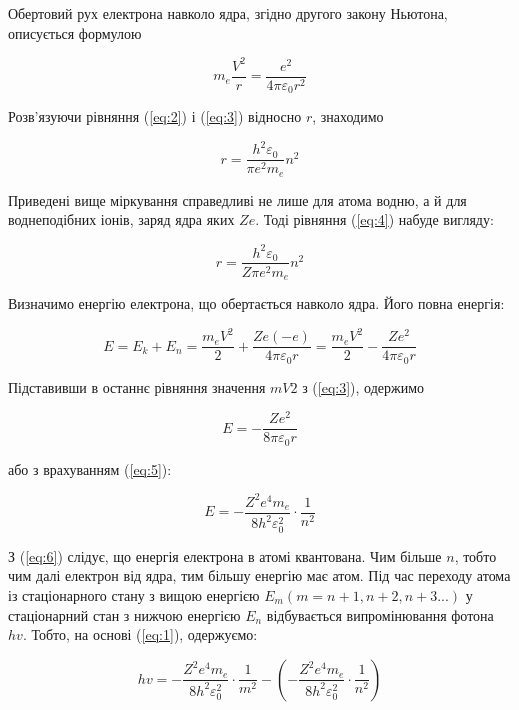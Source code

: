 \documentclass[twocolumn]{el-author}
\begin{document}
Обертовий рух електрона навколо ядра, згідно другого закону
Ньютона, описується формулою

\begin{equation} \label{eq:3}
m_{e} \frac{V^{2}}{r} = \frac{e^{2}}{4 \pi \varepsilon _{0} r ^{2}}
\end{equation}

Розв'язуючи рівняння (\ref{eq:2}) і (\ref{eq:3}) відносно $r$, знаходимо

\begin{equation} \label{eq:4}
r = \frac{h ^{2} \varepsilon _{0}}{\pi e ^{2} m _{e}}n^{2}
\end{equation}

Приведені вище міркування справедливі не лише для атома водню, а й для
воднеподібних іонів, заряд ядра яких $Ze$. Тоді рівняння (\ref{eq:4}) 
набуде вигляду:

\begin{equation} \label{eq:5}
r = \frac{h ^{2} \varepsilon _{0}}{Z \pi e ^{2} m _{e}}n^{2}
\end{equation}

Визначимо енергію електрона, що обертається навколо ядра. Його
повна енергія:

\begin{equation} 
E = E_{k} + E_{n} = \frac{m_{e} V^{2}}{2} 
+ \frac{Ze(-e)}{4 \pi \varepsilon _{0} r} = 
\frac{m_{e} V ^{2}}{2} - 
\frac{Ze^{2}}{4 \pi \varepsilon _{0} r}
\end{equation}

Підставивши в останнє рівняння значення $mV2$ з (\ref{eq:3}), одержимо

\begin{equation} 
E = - \frac{Ze^{2}}{8 \pi \varepsilon _{0} r}
\end{equation}

або з врахуванням (\ref{eq:5}):

\begin{equation} \label{eq:6}
E = - \frac{Z^{2} e^{4} m_{e}}{8h^{2} \varepsilon _{0}^{2}} \cdot \frac{1}{n^{2}}
\end{equation}

З (\ref{eq:6}) слідує, що енергія електрона в атомі квантована. Чим більше $n$,
тобто чим далі електрон від ядра, тим більшу енергію має атом. Під час
переходу атома із стаціонарного стану з вищою енергією
$E_{m} (m=n+1, n+2, n+3...)$ у стаціонарний стан з нижчою енергією $E_{n}$
відбувається випромінювання фотона $hv$. Тобто, на основі (\ref{eq:1}), одержуємо:

\begin{equation} 
hv = - \frac{Z^{2}e^{4}m_{e}}{8h^{2} \varepsilon _{0}^{2}} \cdot
\frac{1}{m^{2}} - 
\left ( - \frac{Z^{2}e^{4}m_{e}}{8h^{2} \varepsilon _{0}^{2}} \cdot \frac{1}{n^{2}} \right )
\end{equation}
\end{document}
